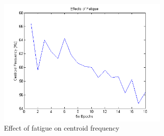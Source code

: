 \documentclass[11pt]{article}
\numberwithin{equation}{section}	%
\begin{document}
\begin{figure}[!ht]
  \centering
    \includegraphics[width=0.75\textwidth]{fig4c}
	\caption{Effect of fatigue on centroid frequency}
	\label{fig4c}
\end{figure}

\clearpage




\end{document}
